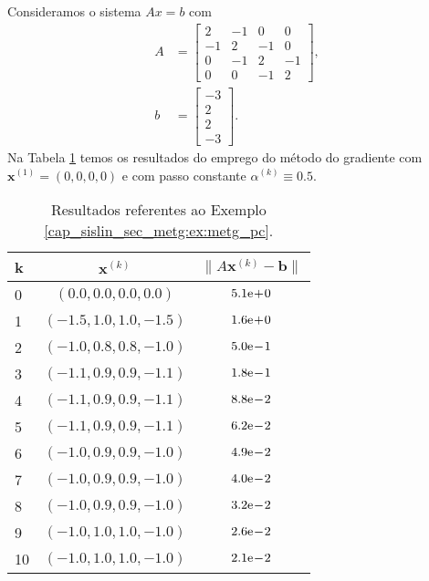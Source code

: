 \begin{ex}\label{cap_sislin_sec_metg:ex:metg_pc}
  Consideramos o sistema $Ax = b$ com
  \begin{align}
    A &=
    \begin{bmatrix}
      2 & -1 & 0 & 0\\
      -1 & 2 & -1 & 0\\
      0 & -1 & 2 & -1 \\
      0 & 0 & -1 & 2
    \end{bmatrix},\\
    b &=
    \begin{bmatrix}
      -3\\
      2\\
      2\\
      -3
    \end{bmatrix}.
  \end{align}
  Na Tabela \ref{cap_sislin_sec_metg:tab:metg_pc} temos os resultados do emprego do método do gradiente com $\pmb{x}^{(1)} = (0, 0, 0, 0)$ e com passo constante $\alpha^{(k)}\equiv 0.5$.

  \begin{table}[H]
    \centering
    \caption{Resultados referentes ao Exemplo \ref{cap_sislin_sec_metg:ex:metg_pc}.}
    \label{cap_sislin_sec_metg:tab:metg_pc}
    \begin{tabular}{l|c|c}
      k & $\pmb{x}^{(k)}$ & $\|A\pmb{x}^{(k)}-\pmb{b}\|$\\\hline
      0 & $(0.0, 0.0, 0.0, 0.0)$ & $5.1\mathrm{e}\!+\!0$\\
      1 & $(-1.5, 1.0, 1.0, -1.5)$ & $1.6\mathrm{e}\!+\!0$\\
      2 & $(-1.0, 0.8, 0.8, -1.0)$ & $5.0\mathrm{e}\!-\!1$\\
      3 & $(-1.1, 0.9, 0.9, -1.1)$ & $1.8\mathrm{e}\!-\!1$\\
      4 & $(-1.1, 0.9, 0.9, -1.1)$ & $8.8\mathrm{e}\!-\!2$\\
      5 & $(-1.1, 0.9, 0.9, -1.1)$ & $6.2\mathrm{e}\!-\!2$\\
      6 & $(-1.0, 0.9, 0.9, -1.0)$ & $4.9\mathrm{e}\!-\!2$\\
      7 & $(-1.0, 0.9, 0.9, -1.0)$ & $4.0\mathrm{e}\!-\!2$\\
      8 & $(-1.0, 0.9, 0.9, -1.0)$ & $3.2\mathrm{e}\!-\!2$\\
      9 & $(-1.0, 1.0, 1.0, -1.0)$ & $2.6\mathrm{e}\!-\!2$\\
      10 & $(-1.0, 1.0, 1.0, -1.0)$ & $2.1\mathrm{e}\!-\!2$\\\hline
    \end{tabular}
  \end{table}


\end{ex}
